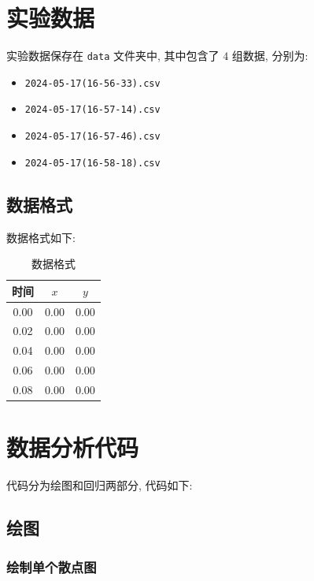 \documentclass{article}
\begin{document}
\begin{appendices}

\section{实验数据}

实验数据保存在 \texttt{data} 文件夹中, 其中包含了 $4$ 组数据, 分别为:

\begin{itemize}
    \item \texttt{2024-05-17(16-56-33).csv}
    \item \texttt{2024-05-17(16-57-14).csv}
    \item \texttt{2024-05-17(16-57-46).csv}
    \item \texttt{2024-05-17(16-58-18).csv}
\end{itemize}

\subsection{数据格式}

数据格式如下:

\begin{table}[H]
    \centering
    \begin{tabular}{ccc}
        \hline
        \textbf{时间} & \textbf{$x$} & \textbf{$y$} \\
        \hline
        0.00 & 0.00 & 0.00 \\
        0.02 & 0.00 & 0.00 \\
        0.04 & 0.00 & 0.00 \\
        0.06 & 0.00 & 0.00 \\
        0.08 & 0.00 & 0.00 \\
        \hline
    \end{tabular}
    \caption{数据格式}
\end{table}

\section{数据分析代码}

代码分为绘图和回归两部分, 代码如下:

\subsection{绘图}

\subsubsection{绘制单个散点图}


\end{appendices}
\end{document}
